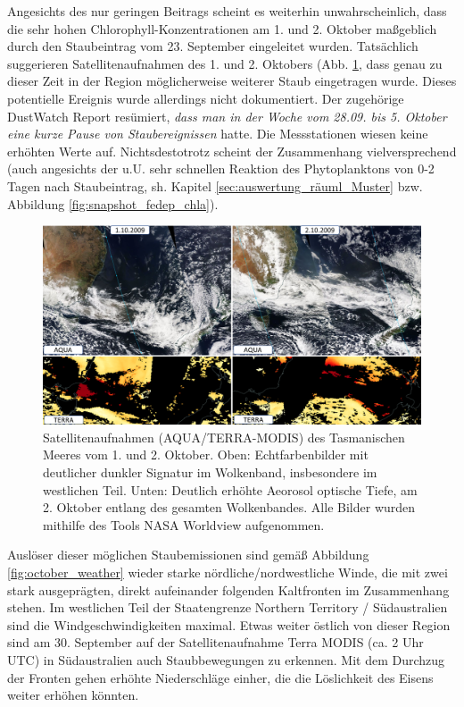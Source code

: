 \documentclass[12pt,a4paper,onecolumn]{scrartcl}
\begin{document}
Angesichts des nur geringen Beitrags scheint es weiterhin unwahrscheinlich, dass die sehr hohen Chlorophyll-Konzentrationen am 1. und 2. Oktober maßgeblich durch den Staubeintrag vom 23. September eingeleitet wurden. Tatsächlich suggerieren Satellitenaufnahmen des 1. und 2. Oktobers (Abb. \ref{fig:satellite_october}, dass genau zu dieser Zeit in der Region möglicherweise weiterer Staub eingetragen wurde. Dieses potentielle Ereignis wurde allerdings nicht dokumentiert. Der zugehörige DustWatch Report \citep{Leys.2009b} resümiert, \textit{dass man in der Woche vom 28.09. bis 5. Oktober eine kurze Pause von Staubereignissen} hatte. Die Messstationen wiesen keine erhöhten Werte auf. Nichtsdestotrotz scheint der Zusammenhang vielversprechend (auch angesichts der u.U. sehr schnellen Reaktion des Phytoplanktons von 0-2 Tagen nach Staubeintrag, sh. Kapitel \ref{sec:auswertung_räuml_Muster} bzw. Abbildung \ref{fig:snapshot_fedep_chla}).
\begin{figure}
\includegraphics[width=\textwidth]{bilder/satellite_october.png}
\caption{Satellitenaufnahmen (AQUA/TERRA-MODIS) des Tasmanischen Meeres vom 1. und 2. Oktober. Oben: Echtfarbenbilder mit deutlicher dunkler Signatur im Wolkenband, insbesondere im westlichen Teil. Unten: Deutlich erhöhte Aeorosol optische Tiefe, am 2. Oktober entlang des gesamten Wolkenbandes. Alle Bilder wurden mithilfe des Tools NASA Worldview aufgenommen.} \label{fig:satellite_october}
\end{figure}
Auslöser dieser möglichen Staubemissionen sind gemäß Abbildung \ref{fig:october_weather} wieder starke nördliche/nordwestliche Winde, die mit zwei stark ausgeprägten, direkt aufeinander folgenden Kaltfronten im Zusammenhang stehen. Im westlichen Teil der Staatengrenze Northern Territory / Südaustralien sind die Windgeschwindigkeiten maximal. Etwas weiter östlich von dieser Region sind am 30. September auf der Satellitenaufnahme Terra MODIS (ca. 2 Uhr UTC) in Südaustralien auch Staubbewegungen zu erkennen. Mit dem Durchzug der Fronten gehen erhöhte Niederschläge einher, die die Löslichkeit des Eisens weiter erhöhen könnten. 
\end{document}
